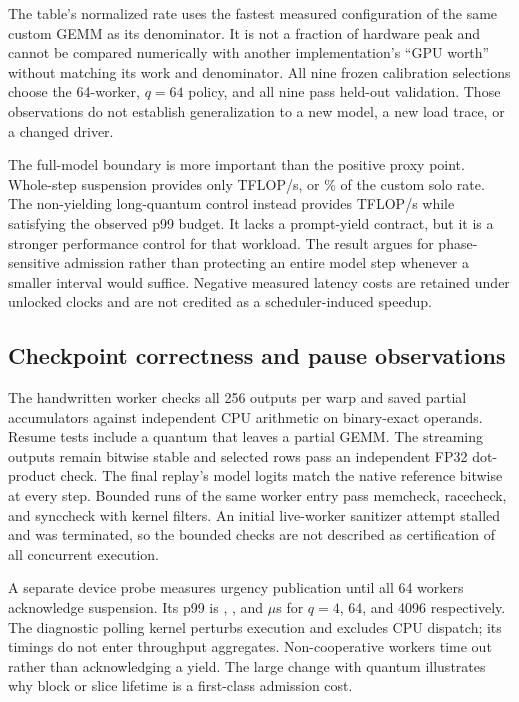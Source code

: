 The table's normalized rate uses the fastest measured configuration of the
same custom GEMM as its denominator. It is not a fraction of hardware peak
and cannot be compared numerically with another implementation's ``GPU
worth'' without matching its work and denominator. All nine frozen
calibration selections choose the 64-worker, $q=64$ policy, and all nine
pass held-out validation. Those observations do not establish generalization
to a new model, a new load trace, or a changed driver.

The full-model boundary is more important than the positive proxy point.
Whole-step suspension provides only \slackModelMediumRate{} TFLOP/s,
or \slackModelMediumFraction\% of the custom solo rate. The non-yielding
long-quantum control instead provides \slackModelLongRate{} TFLOP/s
while satisfying the observed p99 budget. It lacks a prompt-yield contract,
but it is a stronger performance control for that workload. The result
argues for phase-sensitive admission rather than protecting an entire model
step whenever a smaller interval would suffice. Negative measured latency
costs are retained under unlocked clocks and are not credited as a
scheduler-induced speedup.

\subsection{Checkpoint correctness and pause observations}
The handwritten worker checks all 256 outputs per warp and saved partial
accumulators against independent CPU arithmetic on binary-exact operands.
Resume tests include a quantum that leaves a partial GEMM. The streaming
outputs remain bitwise stable and selected rows pass an independent FP32
dot-product check. The final replay's model logits match the native reference
bitwise at every step. Bounded runs of the same worker entry pass memcheck,
racecheck, and synccheck with kernel filters. An initial live-worker sanitizer
attempt stalled and was terminated, so the bounded checks are not described
as certification of all concurrent execution.

A separate device probe measures urgency publication until all 64 workers
acknowledge suspension. Its p99 is \slackPauseShort{},
\slackPauseMedium{}, and \slackPauseLong{} $\mu$s for $q=4$, 64,
and 4096 respectively. The diagnostic polling kernel perturbs execution
and excludes CPU dispatch; its timings do not enter throughput aggregates.
Non-cooperative workers time out rather than acknowledging a yield.
The large change with quantum illustrates why block or slice lifetime is a
first-class admission cost.

